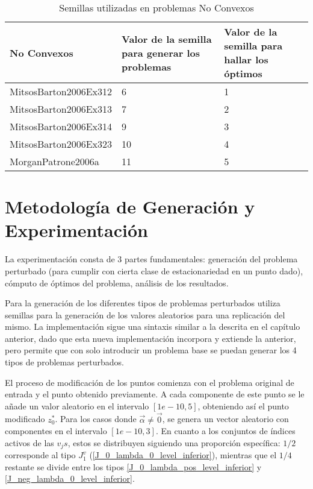     \begin{table}[h!]
        \centering
        \caption{Semillas utilizadas en problemas No Convexos}
        \begin{adjustbox}{max width=\textwidth}
        \begin{tabular}{ | m{5cm} | m{5cm} | m{5cm} | }
          
          \hline
          \textbf{No Convexos} & \textbf{Valor de la semilla para generar los problemas}  & \textbf{Valor de la semilla para hallar los óptimos} \\
          \hline
          MitsosBarton2006Ex312 & 6  & 1\\
          \hline
          MitsosBarton2006Ex313 & 7 & 2 \\
          \hline
          MitsosBarton2006Ex314 & 9 & 3\\
          \hline
          MitsosBarton2006Ex323 & 10 & 4\\
          \hline
          MorganPatrone2006a & 11 & 5 \\
          \hline
        \end{tabular}
     \end{adjustbox}
    \end{table}

    \section{Metodología de Generación y Experimentación}
    La experimentación consta de 3 partes fundamentales: generación del problema perturbado (para cumplir con cierta clase de estacionariedad en un punto dado), cómputo de óptimos del problema, análisis de los resultados.

    Para la generación de los diferentes tipos de problemas perturbados utiliza semillas para la generación de los valores aleatorios para una replicación del mismo.
    La implementación sigue una sintaxis similar a la descrita en el capítulo anterior, dado que esta nueva implementación incorpora y extiende la anterior, pero permite 
    que con solo introducir un problema base se puedan generar los 4 tipos de problemas perturbados.
    
    El proceso de modificación de los puntos comienza con el problema original de entrada y el punto obtenido previamente. A cada componente de este punto se le añade un valor aleatorio en el intervalo $[1e-10, 5]$, obteniendo así el punto modificado $z^*_0$. Para los casos donde $\vec{\alpha}\neq \vec{0}$, se genera un vector aleatorio con componentes en el intervalo $[1e-10, 3]$. En cuanto a los conjuntos de índices activos de las $v_{j}s$, estos se distribuyen siguiendo una proporción específica: $1/2$ corresponde al tipo $J_1^v$ (\ref{J_0_lambda_0_level_inferior}), mientras que el $1/4$ restante se divide entre los tipos \ref{J_0_lambda_pos_level_inferior} y \ref{J_neg_lambda_0_level_inferior}.
    
